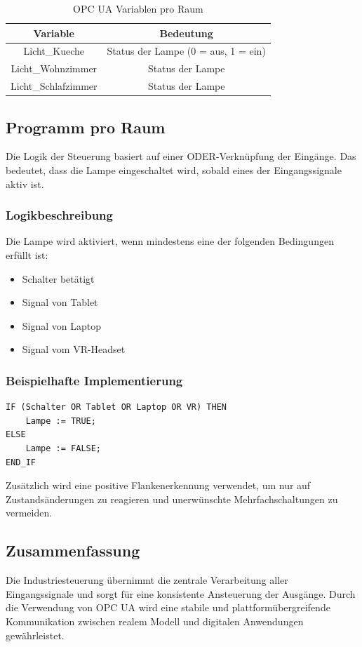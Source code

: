 \begin{table}[h]
\centering
\begin{tabular}{|c|c|}
\hline
\textbf{Variable} & \textbf{Bedeutung} \\
\hline
Licht\_Kueche & Status der Lampe (0 = aus, 1 = ein) \\
Licht\_Wohnzimmer & Status der Lampe \\
Licht\_Schlafzimmer & Status der Lampe \\
\hline
\end{tabular}
\caption{OPC UA Variablen pro Raum}
\end{table}

\subsection{Programm pro Raum}

Die Logik der Steuerung basiert auf einer ODER-Verknüpfung der Eingänge. 
Das bedeutet, dass die Lampe eingeschaltet wird, sobald eines der Eingangssignale aktiv ist.

\subsubsection{Logikbeschreibung}

Die Lampe wird aktiviert, wenn mindestens eine der folgenden Bedingungen erfüllt ist:
\begin{itemize}
    \item Schalter betätigt
    \item Signal von Tablet
    \item Signal von Laptop
    \item Signal vom VR-Headset
\end{itemize}

\subsubsection{Beispielhafte Implementierung}

\begin{verbatim}
IF (Schalter OR Tablet OR Laptop OR VR) THEN
    Lampe := TRUE;
ELSE
    Lampe := FALSE;
END_IF
\end{verbatim}

Zusätzlich wird eine positive Flankenerkennung verwendet, um nur auf Zustandsänderungen zu reagieren und unerwünschte Mehrfachschaltungen zu vermeiden.

\subsection{Zusammenfassung}

Die Industriesteuerung übernimmt die zentrale Verarbeitung aller Eingangssignale und sorgt für eine konsistente Ansteuerung der Ausgänge. 
Durch die Verwendung von OPC UA wird eine stabile und plattformübergreifende Kommunikation zwischen realem Modell und digitalen Anwendungen gewährleistet.